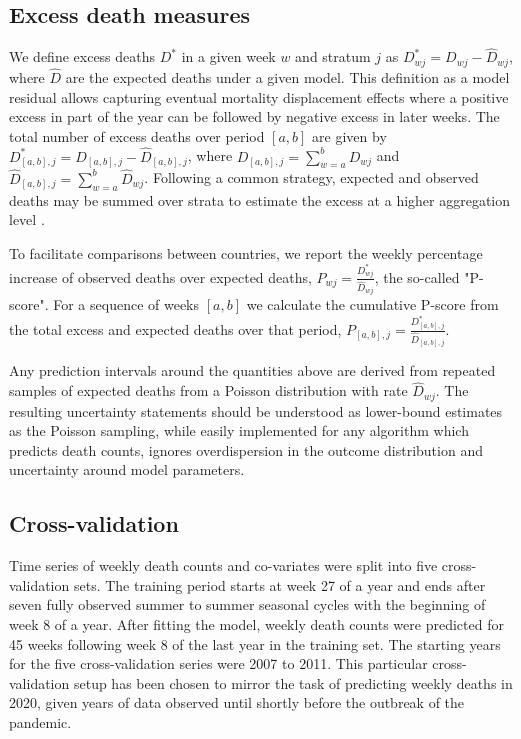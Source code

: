 \documentclass[12pt]{article}
\begin{document}
\subsection*{Excess death measures}

We define excess deaths $D^*$ in a given week $w$ and stratum $j$ as
$D_{wj}^* = D_{wj}-\widehat{D}_{wj}$,
where $\widehat{D}$ are the expected deaths under a given model. This definition as a model residual allows capturing eventual mortality displacement effects where a positive excess in part of the year can be followed by negative excess in later weeks. The total number of excess deaths over period $[a,b]$ are given by
$D_{[a,b], j}^* = D_{[a,b], j} - \widehat{D}_{[a,b], j}$,
where
$D_{[a,b], j}=\sum_{w=a}^b D_{wj}$ and
$\widehat{D}_{[a,b], j}=\sum_{w=a}^b \widehat{D}_{wj}$.
Following a common strategy, expected and observed deaths may be summed over strata to estimate the excess at a higher aggregation level \citep{Barnard2020, Aburto2021, Kontis2020, Weinberger2020}.

To facilitate comparisons between countries, we report the weekly percentage increase of observed deaths over expected deaths,
$P_{wj}=\frac{D_{wj}^*}{\widehat{D}_{wj}}$,
the so-called "P-score". For a sequence of weeks $[a,b]$ we calculate the cumulative P-score from the total excess and expected deaths over that period,
$P_{[a,b], j}=\frac {D_{[a,b], j}^*} {\widehat{D}_{[a,b], j}}$.

Any prediction intervals around the quantities above are derived from repeated samples of expected deaths from a Poisson distribution with rate $\widehat{D}_{wj}$. The resulting uncertainty statements should be understood as lower-bound estimates as the Poisson sampling, while easily implemented for any algorithm which predicts death counts, ignores overdispersion in the outcome distribution and uncertainty around model parameters.

\subsection*{Cross-validation}

Time series of weekly death counts and co-variates were split into five cross-validation sets. The training period starts at week 27 of a year and ends after seven fully observed summer to summer seasonal cycles with the beginning of week 8 of a year. After fitting the model, weekly death counts were predicted for 45 weeks following week 8 of the last year in the training set. The starting years for the five cross-validation series were 2007 to 2011. This particular cross-validation setup has been chosen to mirror the task of predicting weekly deaths in 2020, given years of data observed until shortly before the outbreak of the pandemic.
\end{document}
